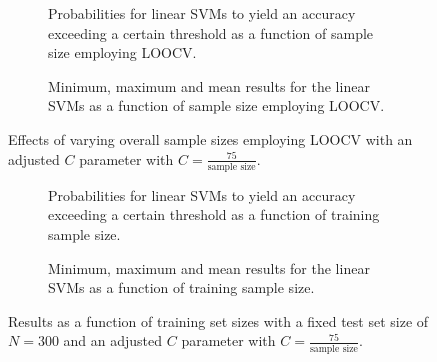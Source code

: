     \begin{figure}[ht]
        \captionsetup[subfigure]{justification=justified,singlelinecheck=false}
        \begin{subfigure}[t]{0.61\textwidth}
            
            \caption{Probabilities for linear SVMs to yield an accuracy exceeding a certain threshold as a function of sample size employing LOOCV.}
        \end{subfigure}
        \hspace{3.0mm}
        \begin{subfigure}[t]{0.34\textwidth}
            
            \caption{Minimum, maximum and mean results for the linear SVMs as a function of sample size employing LOOCV. }
        \end{subfigure}
        \caption[Effects of varying overall sample sizes with an adjusted $C$ parameter.]{Effects of varying overall sample sizes employing LOOCV with an adjusted $C$ parameter with $C=\frac{75}{\text{sample size}}$.}
        \label{fig:adj_c_overall}
    \end{figure}

    \begin{figure}[ht]
        \captionsetup[subfigure]{justification=justified,singlelinecheck=false}
        \begin{subfigure}[t]{0.61\textwidth}
            
            \caption{Probabilities for linear SVMs to yield an accuracy exceeding a certain threshold as a function of training sample size.}
        \end{subfigure}
        \hspace{3.0mm}
        \begin{subfigure}[t]{0.34\textwidth}
            
            \caption{Minimum, maximum and mean results for the linear SVMs as a function of training sample size.}
        \end{subfigure}
        \caption[Effects of varying train sample sizes with an adjusted $C$ parameter.]{Results as a function of training set sizes with a fixed test set size of $N = 300$ and an adjusted $C$ parameter with $C=\frac{75}{\text{sample size}}$.}
        \label{fig:adj_c_test}
    \end{figure}
    \FloatBarrier

